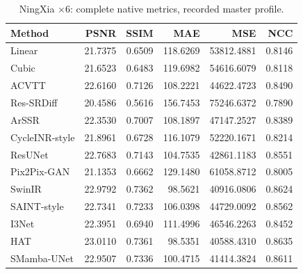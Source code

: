 \begin{table}[t]\centering\small
\caption{NingXia $\times6$: complete native metrics, recorded master profile.}
\begin{tabular}{lrrrrr}\toprule Method&PSNR&SSIM&MAE&MSE&NCC\\\midrule
Linear & 21.7375 & 0.6509 & 118.6269 & 53812.4881 & 0.8146\\
Cubic & 21.6523 & 0.6483 & 119.6982 & 54616.6079 & 0.8118\\
ACVTT & 22.6160 & 0.7126 & 108.2221 & 44622.4723 & 0.8490\\
Res-SRDiff & 20.4586 & 0.5616 & 156.7453 & 75246.6372 & 0.7890\\
ArSSR & 22.3530 & 0.7007 & 108.1897 & 47147.2527 & 0.8389\\
CycleINR-style & 21.8961 & 0.6728 & 116.1079 & 52220.1671 & 0.8214\\
ResUNet & 22.7683 & 0.7143 & 104.7535 & 42861.1183 & 0.8551\\
Pix2Pix-GAN & 21.1353 & 0.6662 & 129.1480 & 61058.8712 & 0.8005\\
SwinIR & 22.9792 & 0.7362 & 98.5621 & 40916.0806 & 0.8624\\
SAINT-style & 22.7341 & 0.7233 & 106.0398 & 44729.0092 & 0.8562\\
I3Net & 22.3951 & 0.6940 & 111.4996 & 46546.2263 & 0.8452\\
HAT & 23.0110 & 0.7361 & 98.5351 & 40588.4310 & 0.8635\\
SMamba-UNet & 22.9507 & 0.7336 & 100.4715 & 41414.3824 & 0.8611\\
\bottomrule\end{tabular}\end{table}
